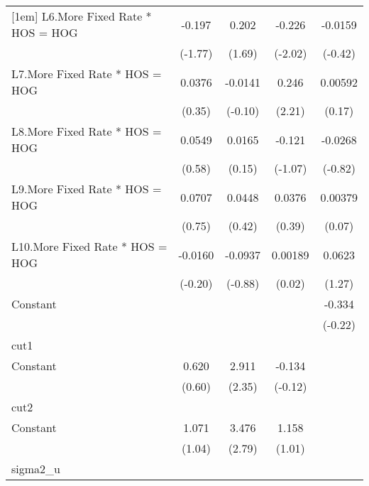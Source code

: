 {\begin{longtable}{l*{4}{c}}
[1em]
L6.More Fixed Rate * HOS = HOG&   -0.197         &    0.202         &   -0.226\sym{*}  &  -0.0159         \\
                &  (-1.77)         &   (1.69)         &  (-2.02)         &  (-0.42)         \\
[1em]
L7.More Fixed Rate * HOS = HOG&   0.0376         &  -0.0141         &    0.246\sym{*}  &  0.00592         \\
                &   (0.35)         &  (-0.10)         &   (2.21)         &   (0.17)         \\
[1em]
L8.More Fixed Rate * HOS = HOG&   0.0549         &   0.0165         &   -0.121         &  -0.0268         \\
                &   (0.58)         &   (0.15)         &  (-1.07)         &  (-0.82)         \\
[1em]
L9.More Fixed Rate * HOS = HOG&   0.0707         &   0.0448         &   0.0376         &  0.00379         \\
                &   (0.75)         &   (0.42)         &   (0.39)         &   (0.07)         \\
[1em]
L10.More Fixed Rate * HOS = HOG&  -0.0160         &  -0.0937         &  0.00189         &   0.0623         \\
                &  (-0.20)         &  (-0.88)         &   (0.02)         &   (1.27)         \\
[1em]
Constant        &                  &                  &                  &   -0.334         \\
                &                  &                  &                  &  (-0.22)         \\
\hline
cut1            &                  &                  &                  &                  \\
Constant        &    0.620         &    2.911\sym{*}  &   -0.134         &                  \\
                &   (0.60)         &   (2.35)         &  (-0.12)         &                  \\
\hline
cut2            &                  &                  &                  &                  \\
Constant        &    1.071         &    3.476\sym{**} &    1.158         &                  \\
                &   (1.04)         &   (2.79)         &   (1.01)         &                  \\
\hline
sigma2\_u        &                  &                  &                  &                  \\

\end{longtable}}
